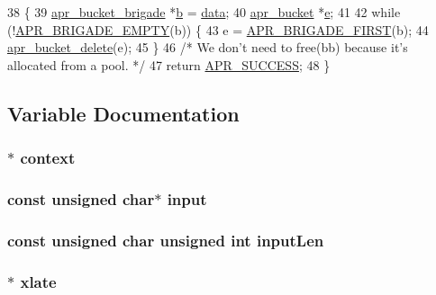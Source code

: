 \begin{DoxyCode}
38 \{
39     \hyperlink{structapr__bucket__brigade}{apr\_bucket\_brigade} *\hyperlink{group__APACHE__CORE__PROTO_ga7fa09c5c80a7d25b74511944f5949e31}{b} = \hyperlink{group__APACHE__CORE__LOG_gae4950db1dbfff8459a712737063b61aa}{data};
40     \hyperlink{structapr__bucket}{apr\_bucket} *\hyperlink{group__APR__Util__Bucket__Brigades_gacd90314acb2c2e5cd19681136c08efac}{e};
41 
42     \textcolor{keywordflow}{while} (!\hyperlink{group__APR__Util__Bucket__Brigades_ga836f61da6cce15074eff257ce4b6fc0f}{APR\_BRIGADE\_EMPTY}(b)) \{
43         e = \hyperlink{group__APR__Util__Bucket__Brigades_gab5826a11eb6ba90786a94282f806c230}{APR\_BRIGADE\_FIRST}(b);
44         \hyperlink{group__APR__Util__Bucket__Brigades_ga8925c02a7f95e8c1c3986294d4678797}{apr\_bucket\_delete}(e);
45     \}
46     \textcolor{comment}{/* We don't need to free(bb) because it's allocated from a pool. */}
47     \textcolor{keywordflow}{return} \hyperlink{group__apr__errno_ga9ee311b7bf1c691dc521d721339ee2a6}{APR\_SUCCESS};
48 \}
\end{DoxyCode}


\subsection{Variable Documentation}
\subsubsection[{\texorpdfstring{context}{context}}]{$\ast$ context}\hypertarget{group__APR__Util__MD4_gaeac02e33573dc2faee64ed16e402da2d}{}\label{group__APR__Util__MD4_gaeac02e33573dc2faee64ed16e402da2d}
\subsubsection[{\texorpdfstring{input}{input}}]{\setlength{\rightskip}{0pt plus 5cm}const unsigned char$\ast$ input}\hypertarget{group__APR__Util__MD4_ga129cf63441c4f73a88c407736149a69e}{}\label{group__APR__Util__MD4_ga129cf63441c4f73a88c407736149a69e}
\subsubsection[{\texorpdfstring{input\+Len}{inputLen}}]{\setlength{\rightskip}{0pt plus 5cm}const unsigned char unsigned {\bf int} input\+Len}\hypertarget{group__APR__Util__MD4_ga81003063f7c6b562141235dc37ade97e}{}\label{group__APR__Util__MD4_ga81003063f7c6b562141235dc37ade97e}
\subsubsection[{\texorpdfstring{xlate}{xlate}}]{$\ast$ xlate}\hypertarget{group__APR__Util__MD4_gaed437fe94bba952b62c87a7e00e337e9}{}\label{group__APR__Util__MD4_gaed437fe94bba952b62c87a7e00e337e9}

